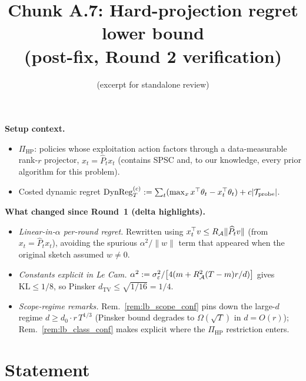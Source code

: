 

\title{Chunk A.7: Hard-projection regret lower bound\\(post-fix, Round 2 verification)}
\author{(excerpt for standalone review)}
\date{}


\maketitle

\textbf{Setup context.}
\begin{itemize}[leftmargin=*,itemsep=1pt,topsep=1pt]
\item $\Pi_{\mathrm{HP}}$: policies whose exploitation action factors
through a data-measurable rank-$r$ projector,
$x_t=\widehat P_t x_t$ (contains SPSC and, to our knowledge, every
prior algorithm for this problem).
\item Costed dynamic regret
$\mathrm{DynReg}_T^{(c)} := \sum_t(\max_x x^\top\theta_t-x_t^\top\theta_t)+c|\mathcal{T}_{\mathrm{probe}}|$.
\end{itemize}

\textbf{What changed since Round~1 (delta highlights).}
\begin{itemize}[leftmargin=*,itemsep=1pt,topsep=1pt]
\item \emph{Linear-in-$\alpha$ per-round regret.} Rewritten using
$x_t^\top v \le R_{\mathcal{A}}\|\widehat P_t v\|$ (from $x_t=\widehat P_t x_t$),
avoiding the spurious $\alpha^2/\|w\|$ term that appeared when the
original sketch assumed $w\ne 0$.
\item \emph{Constants explicit in Le Cam.} $\alpha^2 :=
\sigma_\varepsilon^2/\bigl[4(m+R_{\mathcal{A}}^2(T-m)r/d)\bigr]$ gives
$\mathrm{KL}\le 1/8$, so Pinsker $d_{\mathrm{TV}}\le\sqrt{1/16}=1/4$.
\item \emph{Scope-regime remarks.} Rem.~\ref{rem:lb_scope_conf} pins
down the large-$d$ regime $d\ge d_0\cdot r\,T^{1/3}$ (Pinsker bound
degrades to $\Omega(\sqrt T)$ in $d=O(r)$); Rem.~\ref{rem:lb_class_conf}
makes explicit where the $\Pi_{\mathrm{HP}}$ restriction enters.
\end{itemize}

\section*{Statement}

